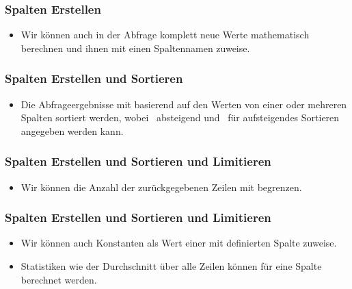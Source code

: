 \documentclass[aspectratio=169,mathserif,notheorems]{beamer}%
\begin{document}
%
%
%
\begin{frame}[t]
\frametitle{Spalten Erstellen}%
\begin{itemize}%
\item Wir können auch in der Abfrage komplett neue Werte mathematisch berechnen\cite{PGDG:PD:MFAO} und ihnen mit  einen Spaltennamen zuweise.%
\end{itemize}%
%
\end{frame}
%
%
%
\begin{frame}[t]
\frametitle{Spalten Erstellen und Sortieren}%
\begin{itemize}%
\item Die Abfrageergebnisse mit  basierend auf den Werten von einer oder mehreren Spalten sortiert werden, wobei ~absteigend und ~für aufsteigendes Sortieren angegeben werden kann.%
\end{itemize}%
%
\end{frame}
%
%
%
\begin{frame}[t]
\frametitle{Spalten Erstellen und Sortieren und Limitieren}%
\begin{itemize}%
\item Wir können die Anzahl der zurückgegebenen Zeilen mit  begrenzen.%
\end{itemize}%
%
\end{frame}
%
%
%
\begin{frame}[t]
\frametitle{Spalten Erstellen und Sortieren und Limitieren}%
\begin{itemize}%
\item Wir können auch Konstanten als Wert einer mit  definierten Spalte zuweise.%
\item<2-> Statistiken wie der Durchschnitt  über alle Zeilen können für eine Spalte~ berechnet werden\cite{PGDG:PD:AF}.%
\end{itemize}%
%
\end{frame}
\end{document}
